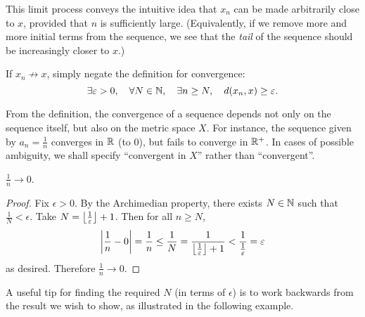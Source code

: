 \begin{remark}
This limit process conveys the intuitive idea that $x_n$ can be made arbitrarily close to $x$, provided that $n$ is sufficiently large. (Equivalently, if we remove more and more initial terms from the sequence, we see that the \emph{tail} of the sequence should be increasingly closer to $x$.)
\end{remark}

\begin{remark}
If $x_n\not\to x$, simply negate the definition for convergence:
\[\exists\varepsilon>0,\quad\forall N\in\mathbb N,\quad\exists n\ge N,\quad d(x_n,x)\ge\varepsilon.\]
\end{remark}

\begin{remark}
From the definition, the convergence of a sequence depends not only on the sequence itself, but also on the metric space $X$. For instance, the sequence given by $a_n=\frac{1}{n}$ converges in $\mathbb R$ (to $0$), but fails to converge in $\mathbb R^+$. In cases of possible ambiguity, we shall specify ``convergent in $X$'' rather than ``convergent''. 
\end{remark}

\begin{example}
$\frac{1}{n}\to 0$.
\begin{proof}
Fix $\epsilon>0$. By the Archimedian property, there exists $N\in\mathbb N$ such that $\frac{1}{N}<\epsilon$. Take $N=\left\lfloor \frac{1}{\varepsilon} \right\rfloor+1$. Then for all $n\ge N$,
\[\left|\frac{1}{n}-0\right|=\frac{1}{n}\le\frac{1}{N}=\frac{1}{\left\lfloor \frac{1}{\varepsilon} \right\rfloor+1}<\frac{1}{\frac{1}{\varepsilon}}=\varepsilon\]
as desired. Therefore $\frac{1}{n}\to0$.
\end{proof}
\end{example}

A useful tip for finding the required $N$ (in terms of $\epsilon$) is to work backwards from the result we wish to show, as illustrated in the following example.

